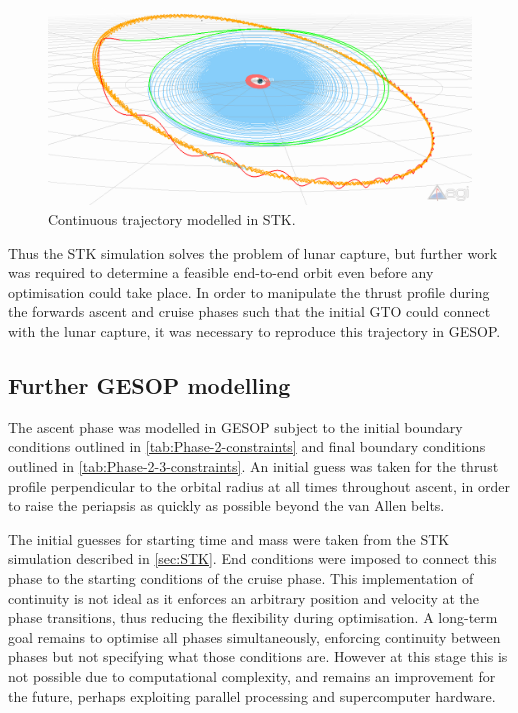 \begin{figure}
\centering
\includegraphics[width=\textwidth]{Images/STK/trajectory_white.png}
\caption{Continuous trajectory modelled in STK.} \label{fig:STK}
\end{figure}

Thus the STK simulation solves the problem of lunar capture, but further work was required to determine a feasible end-to-end orbit even before any optimisation could take place. In order to manipulate the thrust profile during the forwards ascent and cruise phases such that the initial GTO could connect with the lunar capture, it was necessary to reproduce this trajectory in GESOP. 

\subsection{Further GESOP modelling} \label{sub:GESOP2}

The ascent phase was modelled in GESOP subject to the initial boundary conditions outlined in \autoref{tab:Phase-2-constraints} and final boundary conditions outlined in \autoref{tab:Phase-2-3-constraints}. An initial guess was taken for the thrust profile perpendicular to the orbital radius at all times throughout ascent, in order to raise the periapsis as quickly as possible beyond the van Allen belts.

The initial guesses for starting time and mass were taken from the STK simulation described in \autoref{sec:STK}. End conditions were imposed to connect this phase to the starting conditions of the cruise phase. This implementation of continuity is not ideal as it enforces an arbitrary position and velocity at the phase transitions, thus reducing the flexibility during optimisation. A long-term goal remains to optimise all phases simultaneously, enforcing continuity between phases but not specifying what those conditions are. However at this stage this is not possible due to computational complexity, and remains an improvement for the future, perhaps exploiting parallel processing and supercomputer hardware.

